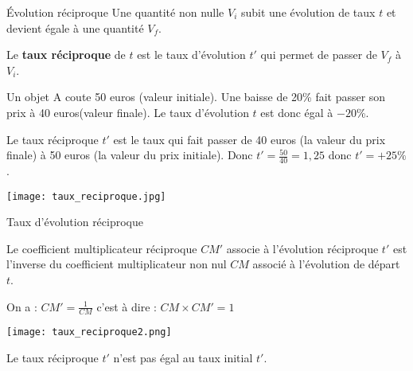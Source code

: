





\begin{DefT}{Évolution réciproque}
Une quantité non nulle $V_i$ subit une évolution de taux $t$ et devient égale à une quantité $V_f$. 

Le \textbf{taux réciproque} de $t$ est le taux d'évolution $t'$ qui permet de passer de $V_f$ à $V_i$.
\end{DefT}


\begin{Ex}
\begin{minipage}{0.7\linewidth}
 
Un objet A coute 50 euros (valeur initiale). Une baisse de 20\% fait passer son prix à 40 euros(valeur finale). Le taux d'évolution $t$ est donc égal à $-20$\%.  

Le taux réciproque $t'$ est le taux qui fait passer de 40 euros (la valeur du prix finale) à 50 euros (la valeur du prix initiale). Donc $t'=\frac{50}{40}=1,25$ donc $t' =+25\%$.
\end{minipage}
\begin{minipage}{0.4\linewidth}
\texttt{[image: taux\_reciproque.jpg]} 
\end{minipage}

\end{Ex}


\begin{ThT}{Taux d'évolution réciproque}
\begin{minipage}{0.74\linewidth}
 Le coefficient multiplicateur réciproque $CM'$ associe à l'évolution réciproque $t'$ est l'inverse du coefficient multiplicateur non nul $CM$ associé à l'évolution de départ $t$. 
 
 On a : $CM' = \frac{1}{CM}$ c'est à dire : $CM \times CM' = 1$ 

\end{minipage}
\hfill
\begin{minipage}{0.25\linewidth}
\texttt{[image: taux\_reciproque2.png]} 
\end{minipage}
\end{ThT}

\ROC





\begin{Rq}
Le taux réciproque $t'$ n'est pas égal au taux initial $t'$.
\end{Rq}
 


 
 